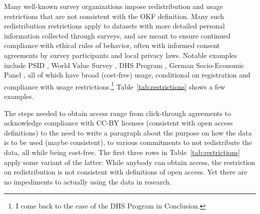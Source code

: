 \documentclass{Revue-economique}
\begin{document}
\begin{Article} [%
	Titre={Reproducibility and Open Science in Economics},
	Auteur={Lars Vilhuber\thanks{Cornell University, lars.vilhuber@cornell.edu}}]
\begin{refsection}[Main]
Many well-known survey organizations impose redistribution and usage restrictions that are not consistent with the OKF definition. Many such redistribution restrictions apply to datasets with more detailed personal information collected through surveys, and are meant to ensure continued compliance with ethical rules of behavior, often with informed consent agreements by survey participants and local privacy laws. Notable examples include  PSID \parencite{institute_for_social_research_panel_2024}, World Value Survey \parencite{haerpfer_world_2024}, \ac{DHS} Program \parencite{dhs_program_demographic_2024}, German Socio-Economic Panel \parencite{goebel_german_2019,goebel_socio-economic_2024}, all of which have broad (cost-free) usage, conditional on registration and compliance with usage restrictions.\footnote{I come back to the case of the \ac{DHS} Program in Conclusion.} Table~\ref{tab:restrictions} shows a few examples. 



The steps needed to obtain access range from click-through agreements to acknowledge compliance with CC-BY licenses (consistent with open access definitions) to the need to write a paragraph about the purpose on how the data is to be used (maybe consistent), to various commitments to not redistribute the data, all while being cost-free. The first three rows in Table~\ref{tab:restrictions} apply some variant of the latter: While anybody can obtain access, the restriction on redistribution is not consistent with definitions of open access. Yet there are no impediments to actually using the data in research. 


\end{refsection}
\end{Article}
\end{document}
